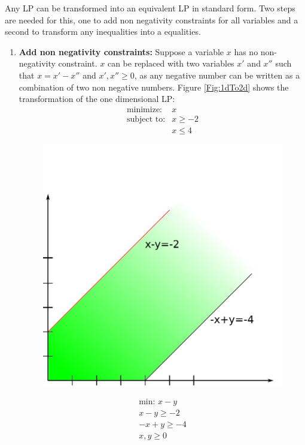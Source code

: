 \begin{pr}
Any LP can be transformed into an equivalent LP in standard form. Two steps are needed for this, one to add non negativity constraints for all variables and a second to transform any inequalities into a equalities.

\begin{enumerate}
\item {\bfseries Add non negativity constraints:} Suppose a variable $x$ has no non-negativity constraint. $x$ can be replaced with two variables $x'$ and $x''$ such that $x=x'-x''$ and $x',x''\geq 0$, as any negative number can be written as a combination of two non negative numbers. Figure \ref{Fig:1dTo2d} shows the transformation of the one dimensional LP:
\begin{eqnarray*}
\text{minimize:}& x \\
\text{subject to:} & x \geq -2\\
& x \leq 4
\end{eqnarray*}

\begin{figure}[hbt]
\begin{minipage}[hbt]{0.4\linewidth}
\includegraphics[width=1\textwidth]{./images/1dTo2d.pdf}
\end{minipage}
\hfill
\begin{minipage}[hbt]{0.4\linewidth}
\begin{align*}
\text{min: } x-y\\
x-y \geq -2\\
-x+y \geq -4\\
x,y \geq 0
\end{align*}


\end{minipage}
\end{figure}
\end{enumerate}
\end{pr}
